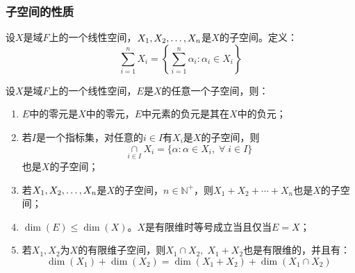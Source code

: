 \subsubsection{子空间的性质}
\begin{definition}
	设$X$是域$F$上的一个线性空间，$X_1, X_2, \dots, X_{n}$是$X$的子空间。定义：
	\begin{equation*}
		\sum_{i=1}^{n}X_i=\left\{\sum_{i=1}^{n}\alpha_i:\alpha_i\in X_i\right\}
	\end{equation*}
\end{definition}
\begin{property}\label{prop:Subspace}
	设$X$是域$F$上的一个线性空间，$E$是$X$的任意一个子空间，则：
	\begin{enumerate}
		\item $E$中的零元是$X$中的零元，$E$中元素的负元是其在$X$中的负元；
		\item 若$I$是一个指标集，对任意的$i\in I$有$X_i$是$X$的子空间，则
		\begin{equation*}
			\underset{i\in I}{\overset{}{\cap}}X_i=\{\alpha:\alpha\in X_i,\;\forall\;i\in I\}
		\end{equation*}
		也是$X$的子空间；
		\item 若$X_1, X_2, \dots, X_{n}$是$X$的子空间，$n\in\mathbb{N}^+$，则$X_1+X_2+\cdots+X_n$也是$X$的子空间；
		\item $\dim(E)\leqslant\dim(X)$。$X$是有限维时等号成立当且仅当$E=X$；
		\item 若$X_1,X_2$为$X$的有限维子空间，则$X_1\cap X_2,\;X_1+X_2$也是有限维的，并且有：
		\begin{equation*}
			\dim(X_1)+\dim(X_2)=\dim(X_1+X_2)+\dim(X_1\cap X_2)
		\end{equation*}
	\end{enumerate}
\end{property}
